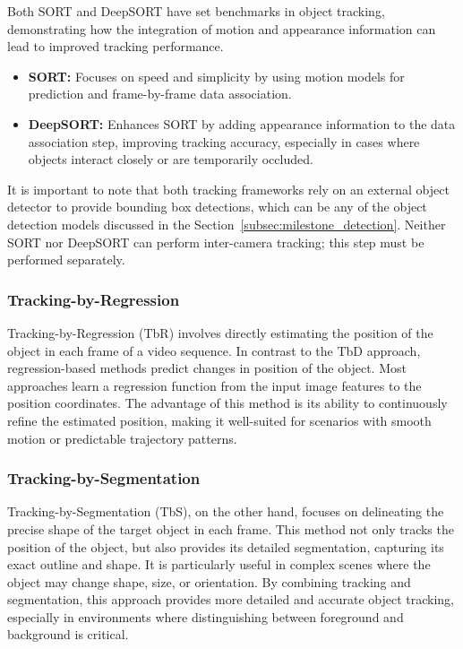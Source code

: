 Both SORT and DeepSORT have set benchmarks in object tracking, demonstrating how the integration of motion and appearance information can lead to improved tracking performance.

\begin{itemize}
    \item \textbf{SORT:} Focuses on speed and simplicity by using motion models for prediction and frame-by-frame data association.
    \item \textbf{DeepSORT:} Enhances SORT by adding appearance information to the data association step, improving tracking accuracy, especially in cases where objects interact closely or are temporarily occluded.
\end{itemize}

It is important to note that both tracking frameworks rely on an external object detector to provide bounding box detections, which can be any of the object detection models discussed in the Section~\ref{subsec:milestone_detection}. Neither SORT nor DeepSORT can perform inter-camera tracking; this step must be performed separately.

\subsubsection{Tracking-by-Regression}\label{subsubsec:tracking-by-regression}
Tracking-by-Regression (TbR) involves directly estimating the position of the object in each frame of a video sequence. In contrast to the TbD approach, regression-based methods predict changes in position of the object. Most approaches learn a regression function from the input image features to the position coordinates. The advantage of this method is its ability to continuously refine the estimated position, making it well-suited for scenarios with smooth motion or predictable trajectory patterns.

\subsubsection{Tracking-by-Segmentation}\label{subsubsec:tracking-by-segmentation}
Tracking-by-Segmentation (TbS), on the other hand, focuses on delineating the precise shape of the target object in each frame. This method not only tracks the position of the object, but also provides its detailed segmentation, capturing its exact outline and shape. It is particularly useful in complex scenes where the object may change shape, size, or orientation. By combining tracking and segmentation, this approach provides more detailed and accurate object tracking, especially in environments where distinguishing between foreground and background is critical.

